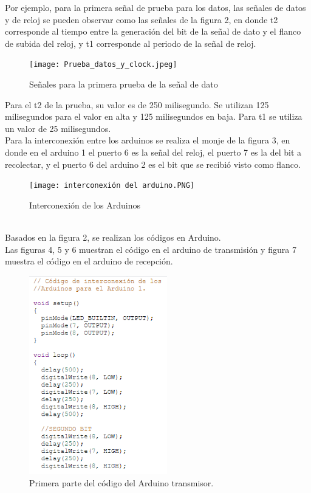 \documentclass{article}
\begin{document}
Por ejemplo, para la primera señal de prueba para los datos, las señales de datos y de reloj se pueden observar como las señales de la figura 2, en donde t2 corresponde al tiempo entre la generación del bit de la señal de dato y el flanco de subida del reloj, y t1 corresponde al periodo de la señal de reloj.\\

\begin{figure}[h]
\texttt{[image: Prueba\_datos\_y\_clock.jpeg]}
\centering
\caption{Señales para la primera prueba de la señal de dato}
\label{fig:Prueba_datos_y_clock.jpeg}
\end{figure}

Para el t2 de la prueba, su valor es de 250 milisegundo. Se utilizan 125 milisegundos para el valor en alta y 125 milisegundos en baja. Para t1 se utiliza un valor de 25 milisegundos.\\


Para la interconexión entre los arduinos se realiza el monje de la figura 3, en donde en el arduino 1 el puerto 6 es la señal del reloj, el puerto 7 es la del bit a recolectar, y el puerto 6 del arduino 2 es el bit que se recibió visto como flanco.


\begin{figure}[h]
\texttt{[image: interconexión del arduino.PNG]}
\centering
\caption{Interconexión de los Arduinos}
\label{fig:interconexión del arduino.PNG}
\end{figure}
\cite{punto2}\\

Basados en la figura 2, se realizan los códigos en Arduino.\\


Las figuras 4, 5 y 6 muestran el código en el arduino de transmisión y figura 7 muestra el código en el arduino de recepción.\\

\newpage

\begin{figure}[h]
\includegraphics[width=6cm]{codigo_arduino1_1.PNG}
\centering
\caption{Primera parte del código del Arduino transmisor.}
\label{fig:codigo_arduino1_1.PNG}
\end{figure}
\cite{punto2}\\
\end{document}
